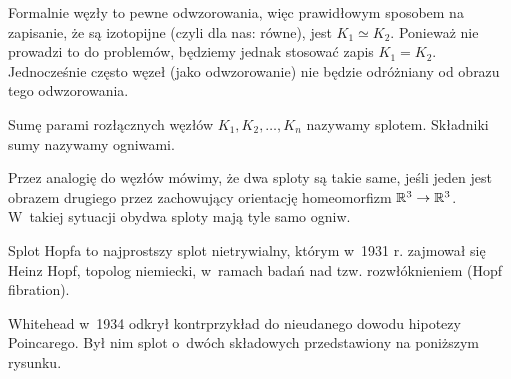 Formalnie węzły to pewne odwzorowania, więc prawidłowym sposobem na zapisanie, że są izotopijne (czyli dla nas: równe), jest $K_1 \simeq K_2$.
Ponieważ nie prowadzi to do problemów, będziemy jednak stosować zapis $K_1 = K_2$.
Jednocześnie często węzeł (jako odwzorowanie) nie będzie odróżniany od obrazu tego odwzorowania.

\begin{definition}

    Sumę parami rozłącznych węzłów $K_1, K_2, \ldots, K_n$ nazywamy splotem.
    Składniki sumy nazywamy ogniwami.
\end{definition}

Przez analogię do węzłów mówimy, że dwa sploty są takie same, jeśli jeden jest obrazem drugiego przez zachowujący orientację homeomorfizm $\mathbb R^3 \to \mathbb R^3$.
W~takiej sytuacji obydwa sploty mają tyle samo ogniw.

\begin{example}
    Splot Hopfa to najprostszy splot nietrywialny, którym w~1931 r. zajmował się Heinz Hopf, topolog niemiecki, w~ramach badań nad tzw. rozwłóknieniem (Hopf fibration).
\end{example}

\begin{example}
    Whitehead w~1934 odkrył kontrprzykład do nieudanego dowodu hipotezy Poincarego.
    Był nim splot o~dwóch składowych przedstawiony na poniższym rysunku.
\end{example}

